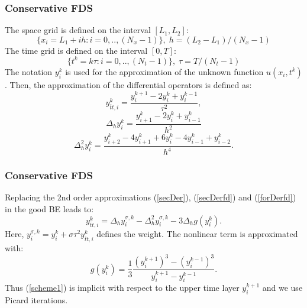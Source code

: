 \documentclass{beamer}
\newcommand{\rf}[1]{(\ref{#1})}
\begin{document}

\begin{frame}
\frametitle{Conservative FDS}
The space grid is defined on the interval $[L_1, L_2]$:
\begin{equation}
 \{x_i =L_1 +  i h : i = 0,..,(N_x-1) \}, \; h = (L_2-L_1)/(N_x-1)
\end{equation}
The time grid is defined on the interval $[0, T]$:
\begin{equation}
 \{t^k = k \tau: i = 0,..,(N_t-1) \}, \; \tau = T/(N_t-1)
\end{equation}
The notation $y_i^k$ is used for the approximation of the unknown function $u(x_i, t^k)$. Then, the approximation of the differential operators is defined as:
\begin{equation}\label{secDer}
y_{\bar{t}t,i}^k=\dfrac{y_i^{k+1}-2y_i^k+y_i^{k-1}}{\tau^2},
\end{equation}
\begin{equation}\label{secDerfd}
\Delta_h y_i^k=\dfrac{y_{i+1}^k-2y_i^k+y_{i-1}^k}{h^2}
\end{equation}
\begin{equation}\label{forDerfd}
\Delta_h^2 y_i^k=\dfrac{y_{i+2}^k-4y_{i+1}^k+6y_{i}^k-4y_{i-1}^k+y_{i-2}^k}{h^4}.
\end{equation}

\end{frame}


\begin{frame}
\frametitle{Conservative FDS}
Replacing the 2nd order approximations \rf{secDer}, \rf{secDerfd} and \rf{forDerfd} in the good BE leads to:
\begin{equation}\label{scheme1}
y_{\bar{t}t,i}^k=\Delta_h y_i^{\sigma,k}-\Delta_h^2 y_i^{\sigma,k} -3\Delta_h g(y_i^k).
\end{equation}
Here, $ y_i^{\sigma,k}= y_i^{k}+\sigma \tau^2 y_{\bar{t}t,i}^k$ defines the weight.
The nonlinear term is approximated with:
\begin{equation}\label{nonLin}
g(y_i^k) = \frac{1}{3} \frac{(y_i^{k+1})^3 - (y_i^{k-1})^3}{y_i^{k+1} - y_i^{k-1}}.
\end{equation}
Thus \rf{scheme1} is implicit with respect to the upper time layer $y_i^{k+1}$ and we use Picard iterations.
\end{frame}


\end{document}
